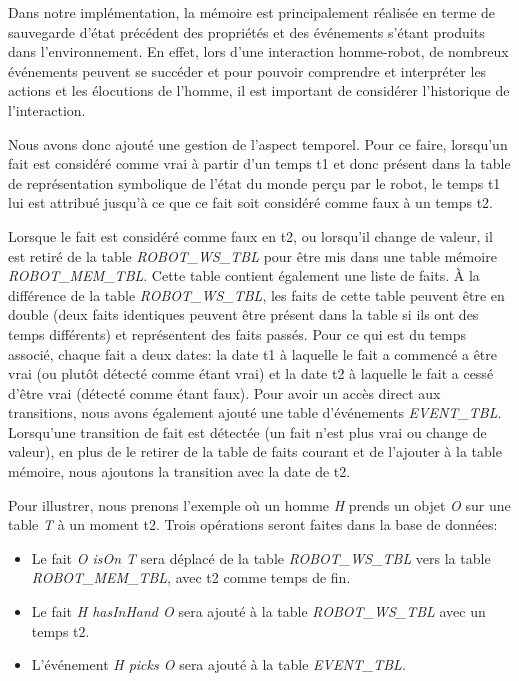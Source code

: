 \documentclass[a4paper,11pt,twoside]{StyleThese}
\begin{document}
Dans notre implémentation, la mémoire est principalement réalisée en terme de sauvegarde d'état précédent des propriétés et des événements s'étant produits dans l'environnement.
En effet, lors d'une interaction homme-robot, de nombreux événements peuvent se succéder et pour pouvoir comprendre et interpréter les actions et les élocutions de l'homme, il est important de considérer l'historique de l'interaction.

Nous avons donc ajouté une gestion de l'aspect temporel.
Pour ce faire, lorsqu'un fait est considéré comme vrai à partir d'un temps t1 et donc présent dans la table de représentation symbolique de l'état du monde perçu par le robot, le temps t1 lui est attribué jusqu'à ce que ce fait soit considéré comme faux à un temps t2.

Lorsque le fait est considéré comme faux en t2, ou lorsqu'il change de valeur, il est retiré de la table \textit{ROBOT\_WS\_TBL} pour être mis dans une table mémoire \textit{ROBOT\_MEM\_TBL}. Cette table contient également une liste de faits. À la différence de la table \textit{ROBOT\_WS\_TBL}, les faits de cette table peuvent être en double (deux faits identiques peuvent être présent dans la table si ils ont des temps différents) et représentent des faits passés. Pour ce qui est du temps associé, chaque fait a deux dates: la date t1 à laquelle le fait a commencé a être vrai (ou plutôt détecté comme étant vrai) et la date t2 à laquelle le fait a cessé d'être vrai (détecté comme étant faux).
Pour avoir un accès direct aux transitions, nous avons également ajouté une table d'événements \textit{EVENT\_TBL}. Lorsqu'une transition de fait est détectée (un fait n'est plus vrai ou change de valeur), en plus de le retirer de la table de faits courant et de l'ajouter à la table mémoire, nous ajoutons la transition avec la date de t2. 

Pour illustrer, nous prenons l'exemple où un homme \textit{H} prends un objet \textit{O} sur une table \textit{T} à un moment t2. Trois opérations seront faites dans la base de données:

\begin{itemize}
\item Le fait \textit{O isOn T} sera déplacé de la table \textit{ROBOT\_WS\_TBL} vers la table \textit{ROBOT\_MEM\_TBL}, avec t2 comme temps de fin.
\item Le fait  \textit{H hasInHand O} sera ajouté à la table \textit{ROBOT\_WS\_TBL} avec un temps t2.
\item L'événement \textit{H picks O} sera ajouté à la table \textit{EVENT\_TBL}.
\end{itemize}
\end{document}
